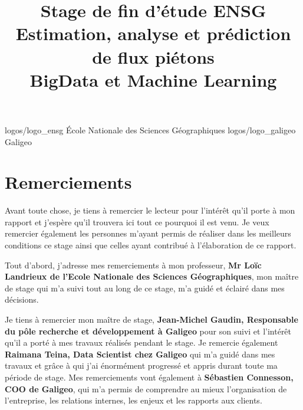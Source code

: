 \documentclass{themeensg}
\title{Stage de fin d'étude ENSG \\ Estimation, analyse et prédiction de flux piétons \\ BigData et Machine Learning}
\renewcommand{\author}{Jules Pierrat}
\begin{document}
\begin{titlepage}
\enterprise 
{logos/logo_ensg}
{\'Ecole Nationale des Sciences Géographiques}
{logos/logo_galigeo}
{Galigeo}





\infos{\author}{Septembre 2022}
\end{titlepage}



\newevenpage
\chapter*{Remerciements}

Avant toute chose, je tiens à remercier le lecteur pour l’intérêt qu’il porte à mon rapport et j’espère qu’il trouvera ici tout ce pourquoi il est venu. Je veux remercier également les personnes m’ayant permis de réaliser dans les meilleurs conditions ce stage ainsi que celles ayant contribué à l’élaboration de ce rapport.

Tout d'abord, j'adresse mes remerciements à mon professeur, \textbf{Mr Loïc Landrieux de l’Ecole Nationale des Sciences Géographiques}, mon maître de stage qui m’a suivi tout au long de ce stage, m’a guidé et éclairé dans mes décisions.

Je tiens à remercier mon maître de stage, \textbf{Jean-Michel Gaudin, Responsable du pôle recherche et développement à Galigeo} pour son suivi et l’intérêt qu’il a porté à mes travaux réalisés pendant le stage. Je remercie également \textbf{Raimana Teina, Data Scientist chez Galigeo} qui m’a guidé dans mes travaux et grâce à qui j’ai énormément progressé et appris durant toute ma période de stage. Mes remerciements vont également à \textbf{Sébastien Connesson, COO de Galigeo}, qui m’a permis de comprendre au mieux l’organisation de l’entreprise, les relations internes, les enjeux et les rapports aux clients.
\end{document}
